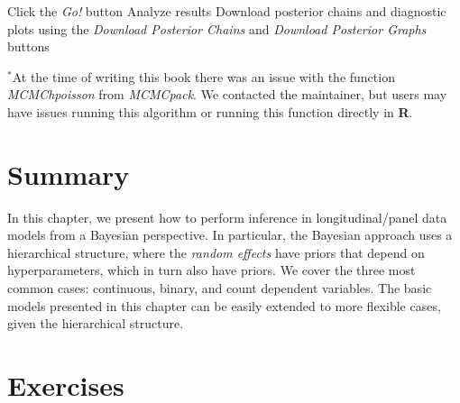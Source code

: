\begin{algorithm}[h!]
\begin{algorithmic}[1]
		\State Click the \textit{Go!} button
		\State Analyze results
		\State Download posterior chains and diagnostic plots using the \textit{Download Posterior Chains} and \textit{Download Posterior Graphs} buttons
	\end{algorithmic}
	$^*${\footnotesize{At the time of writing this book there was an issue with the function \textit{MCMChpoisson} from \textit{MCMCpack}. We contacted the maintainer, but users may have issues running this algorithm or running this function directly in \textbf{R}.}} 
\end{algorithm}


\section{Summary}\label{sec94}
In this chapter, we present how to perform inference in longitudinal/panel data models from a Bayesian perspective. In particular, the Bayesian approach uses a hierarchical structure, where the \textit{random effects} have priors that depend on hyperparameters, which in turn also have priors. We cover the three most common cases: continuous, binary, and count dependent variables. The basic models presented in this chapter can be easily extended to more flexible cases, given the hierarchical structure.

\section{Exercises}\label{sec95}


